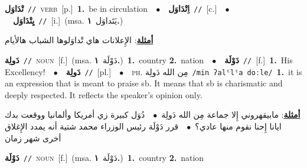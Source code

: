 \documentclass[10pt,a4paper,twoside]{article} %
\begin{document}
\begin{multicols}{2}
{\setlength\topsep{0pt}\textbf{\foreignlanguage{arabic}{تْدَاوَل}}\ {\color{gray}\texttt{//}\color{black}}\ \textsc{verb}\ [p.]\ \textbf{1.}~be in circulation\ \ $\bullet$\ \ \setlength\topsep{0pt}\textbf{\foreignlanguage{arabic}{اِتْدَاوَل}}\ {\color{gray}\texttt{//}\color{black}}\ [c.]\ \ $\bullet$\ \ \setlength\topsep{0pt}\textbf{\foreignlanguage{arabic}{يِتْدَاوَل}}\ {\color{gray}\texttt{//}\color{black}}\ [i.]\ \color{gray}(msa. \foreignlanguage{arabic}{يَتَداوَل}~\foreignlanguage{arabic}{\textbf{١.}})\color{black}\  \begin{flushright}\color{gray}\foreignlanguage{arabic}{\textbf{\underline{\foreignlanguage{arabic}{أمثلة}}}: الإِعلانات هاي تْداوَلوها الشباب هالأيام}\end{flushright}\color{black}} \vspace{2mm}

{\setlength\topsep{0pt}\textbf{\foreignlanguage{arabic}{دَولِة}}\ {\color{gray}\texttt{//}\color{black}}\ \textsc{noun}\ [f.]\ \color{gray}(msa. \foreignlanguage{arabic}{دَوْلَة}~\foreignlanguage{arabic}{\textbf{١.}})\color{black}\ \textbf{1.}~country  \textbf{2.}~nation\ \ $\bullet$\ \ \setlength\topsep{0pt}\textbf{\foreignlanguage{arabic}{دَوْلَة}}\ {\color{gray}\texttt{//}\color{black}}\ [f.]\ \textbf{1.}~His Excellency!\ \ $\bullet$\ \ \setlength\topsep{0pt}\textbf{\foreignlanguage{arabic}{دَولِة}}\ {\color{gray}\texttt{//}\color{black}}\ [pl.]\ \ $\bullet$\ \ \textsc{ph.} \color{gray} \foreignlanguage{arabic}{مِن الله دَولِة}\color{black}\ {\color{gray}\texttt{/{\sffamily min ʔalˤlˤa doːle}/}\color{black}}\ \textbf{1.}~it is an expression that is meant to praise sb. It means that sb is charismatic and deeply respected. It reflects the speaker's opinion only.\  \begin{flushright}\color{gray}\foreignlanguage{arabic}{\textbf{\underline{\foreignlanguage{arabic}{أمثلة}}}: مابيقهروني إِلا جماعة مِن الله دَولِة\ $\bullet$\ \  دُوَل كبيرة زي أمريكا وألمانيا ووقعت بدك ايانا إِحنا نقوم منها عادي؟\ $\bullet$\ \  قرر دَوْلَة رئيس الوزراء محمد شتية أنه يمدد الإِغلاق أخرى شهر زمان}\end{flushright}\color{black}} \vspace{2mm}

{\setlength\topsep{0pt}\textbf{\foreignlanguage{arabic}{دَوْلَة}}\ {\color{gray}\texttt{//}\color{black}}\ \textsc{noun}\ [f.]\ \color{gray}(msa. \foreignlanguage{arabic}{دَوْلَة}~\foreignlanguage{arabic}{\textbf{١.}})\color{black}\ \textbf{1.}~country  \textbf{2.}~nation\ } \vspace{2mm}


\end{multicols}
\end{document}

